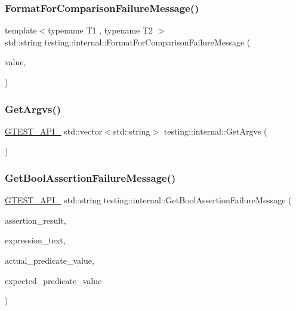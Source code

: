 \subsubsection{\texorpdfstring{Format\+For\+Comparison\+Failure\+Message()}{FormatForComparisonFailureMessage()}}
{\footnotesize\ttfamily template$<$typename T1 , typename T2 $>$ \\
std\+::string testing\+::internal\+::\+Format\+For\+Comparison\+Failure\+Message (\begin{DoxyParamCaption}\item[{const T1 \&}]{value,  }\item[{const T2 \&}]{ }\end{DoxyParamCaption})}

\mbox{\label{namespacetesting_1_1internal_a8d8ed3acadedd9c0db28d35a188973ea}} 
\subsubsection{\texorpdfstring{Get\+Argvs()}{GetArgvs()}}
{\footnotesize\ttfamily \hyperlink{gtest-port_8h_aa73be6f0ba4a7456180a94904ce17790}{G\+T\+E\+S\+T\+\_\+\+A\+P\+I\+\_\+} std\+::vector$<$std\+::string$>$ testing\+::internal\+::\+Get\+Argvs (\begin{DoxyParamCaption}{ }\end{DoxyParamCaption})}

\mbox{\label{namespacetesting_1_1internal_aed8d3ad4341f8f2de53440e39c995632}} 
\subsubsection{\texorpdfstring{Get\+Bool\+Assertion\+Failure\+Message()}{GetBoolAssertionFailureMessage()}}
{\footnotesize\ttfamily \hyperlink{gtest-port_8h_aa73be6f0ba4a7456180a94904ce17790}{G\+T\+E\+S\+T\+\_\+\+A\+P\+I\+\_\+} std\+::string testing\+::internal\+::\+Get\+Bool\+Assertion\+Failure\+Message (\begin{DoxyParamCaption}\item[{const Assertion\+Result \&}]{assertion\+\_\+result,  }\item[{const char $\ast$}]{expression\+\_\+text,  }\item[{const char $\ast$}]{actual\+\_\+predicate\+\_\+value,  }\item[{const char $\ast$}]{expected\+\_\+predicate\+\_\+value }\end{DoxyParamCaption})}

